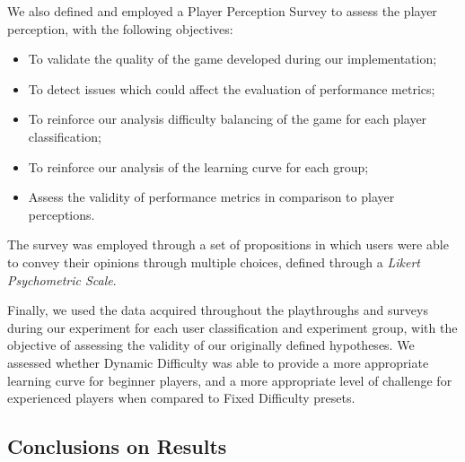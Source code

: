 We also defined and employed a Player Perception Survey to assess the player perception, with the following objectives:
\begin{itemize}
	\item{To validate the quality of the game developed during our implementation;}
	\item{To detect issues which could affect the evaluation of performance metrics;}
	\item{To reinforce our analysis difficulty balancing of the game for each player classification;}
	\item{To reinforce our analysis of the learning curve for each group;}
	\item{Assess the validity of performance metrics in comparison to player perceptions.}
\end{itemize}
The survey was employed through a set of propositions in which users were able to convey their opinions through multiple choices, defined through a \emph{Likert Psychometric Scale}.

Finally, we used the data acquired throughout the playthroughs and surveys during our experiment for each user classification and experiment group, with the objective of assessing the validity of our originally defined hypotheses. We assessed whether Dynamic Difficulty was able to provide a more appropriate learning curve for beginner players, and a more appropriate level of challenge for experienced players when compared to Fixed Difficulty presets.


\subsection{Conclusions on Results}



